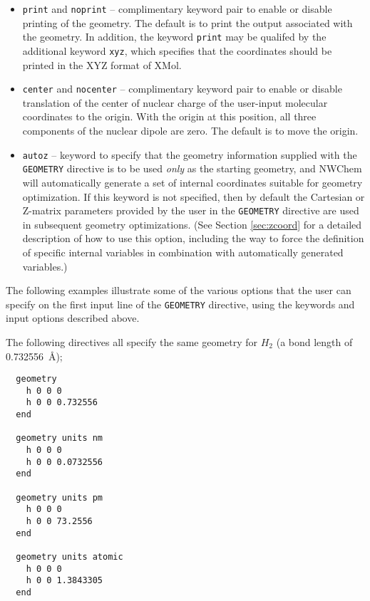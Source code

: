 \begin{itemize}
\item \verb+print+ and \verb+noprint+ -- complimentary keyword pair to
enable or disable printing of the geometry.  The default is to print   
the output associated with the geometry.  In addition, the keyword 
\verb+print+ may
be qualifed by the additional keyword \verb+xyz+, which specifies
that the coordinates should be printed in the XYZ format of XMol.

\item \verb+center+ and \verb+nocenter+ -- complimentary keyword pair
  to enable or disable translation of the center of nuclear charge of
  the user-input molecular coordinates to the origin.  With the
  origin at this position, all three components of the nuclear dipole
  are zero.  The default is to move the origin.

\item \verb+autoz+ -- keyword to specify that the geometry 
information supplied
with the \verb+GEOMETRY+ directive is to be used {\em only} as the starting
geometry, and NWChem will automatically generate a set of internal coordinates
suitable for geometry optimization.  If this keyword is not specified, then
by default the Cartesian or Z-matrix parameters provided by the user
in the \verb+GEOMETRY+ directive are used in subsequent geometry
optimizations. 
(See Section \ref{sec:zcoord} for a detailed description of how to
use this option, including the way to
force the definition of specific internal variables in combination
with automatically generated variables.)
\end{itemize}

The following examples illustrate some of the various options that the user
can specify on the first input line of the \verb+GEOMETRY+ directive, using
the keywords and input options described above.


The following directives all specify the same geometry for $H_2$
(a bond length of 0.732556\ \AA);
\begin{verbatim}
  geometry
    h 0 0 0
    h 0 0 0.732556
  end

  geometry units nm
    h 0 0 0
    h 0 0 0.0732556
  end

  geometry units pm
    h 0 0 0
    h 0 0 73.2556
  end

  geometry units atomic
    h 0 0 0
    h 0 0 1.3843305
  end
\end{verbatim}
      
